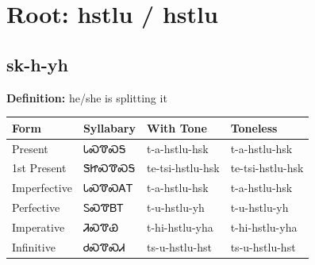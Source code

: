 \documentclass{article}%
\begin{document}
%
\normalsize%
\section*{Root: hstlu / hstlu}%
\subsection*{sk-h-yh}%
\textbf{Definition: }%
he/she is splitting it%
\\[0.5em]%
\begin{tabular}{|l|l|l|l|}%
\hline%
\textbf{Form}&\textbf{Syllabary}&\textbf{With Tone}&\textbf{Toneless}\\%
\hline%
Present&ᏓᏍᏡᏍᎦ&t{-}a{-}hstlu{-}hsk&t{-}a{-}hstlu{-}hsk\\%
1st Present&ᏕᏥᏍᏡᏍᎦ&te{-}tsi{-}hstlu{-}hsk&te{-}tsi{-}hstlu{-}hsk\\%
Imperfective&ᏓᏍᏡᏍᎪᎢ&t{-}a{-}hstlu{-}hsk&t{-}a{-}hstlu{-}hsk\\%
Perfective&ᏚᏍᏡᏴᎢ&t{-}u{-}hstlu{-}yh&t{-}u{-}hstlu{-}yh\\%
Imperative&ᏘᏍᏡᏯ&t{-}hi{-}hstlu{-}yha&t{-}hi{-}hstlu{-}yha\\%
Infinitive&ᏧᏍᏡᏍᏗ&ts{-}u{-}hstlu{-}hst&ts{-}u{-}hstlu{-}hst\\%
\hline%
\end{tabular}%
\\[1em]%
\end{document}
